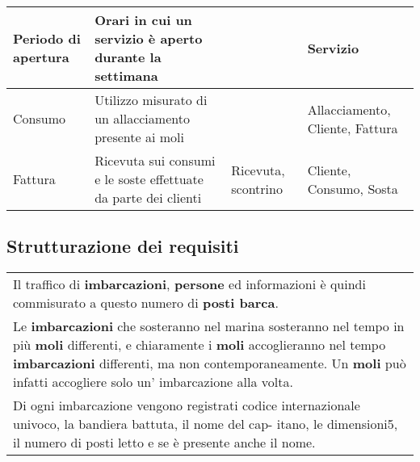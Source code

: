 \begin{center}
\begin{tabularx}{\textwidth}{|>{\RaggedRight}p{2cm}|p{7cm}|p{2.4cm}|>{\RaggedRight}X|}
        \hline
        Periodo di apertura & Orari in cui un servizio è aperto durante la settimana & & Servizio\\

        \hline
        Consumo & Utilizzo misurato di un allacciamento presente ai moli & & Allacciamento, Cliente, Fattura \\
       
        \hline
        Fattura & Ricevuta sui consumi e le soste effettuate da parte dei clienti & Ricevuta, scontrino & Cliente, Consumo, Sosta\\
        
        \hline
    \end{tabularx}
\end{center}

\subsection{Strutturazione dei requisiti}

\begin{center}
    \begin{tabularx}{\textwidth}{|X|}
        \hline
        \rowcolor{gray!30}
        \multicolumn{1}{|c|}{\textbf{Frasi relative a Imbarcazione}}\\
        \hline
        Il traffico di \textbf{imbarcazioni}, \textbf{persone} ed informazioni è quindi commisurato a questo numero di \textbf{posti barca}. \\

        Le \textbf{imbarcazioni} che sosteranno nel marina sosteranno nel tempo in più \textbf{moli} differenti, e chiaramente i \textbf{moli} accoglieranno nel tempo \textbf{imbarcazioni} differenti, ma non contemporaneamente. Un \textbf{moli} può infatti accogliere solo un’ imbarcazione alla volta. \\

        Di ogni imbarcazione vengono registrati codice internazionale univoco, la bandiera battuta, il nome del cap- itano, le dimensioni5, il numero di posti letto e se è presente anche il nome.\\
        \hline
    \end{tabularx}
\end{center}

